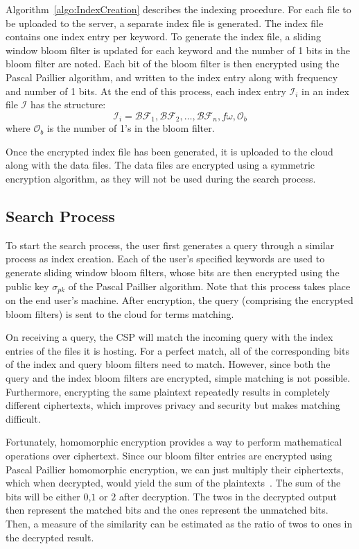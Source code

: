 Algorithm~\ref{algo:IndexCreation} describes the indexing procedure.
For each file to be uploaded to the server, a separate index file is generated. The index
file contains one index entry per keyword. To generate the index file, a sliding window bloom
filter is updated for each keyword and the number of 1 bits in the bloom filter are noted.
Each bit of the bloom filter is then encrypted using the Pascal Paillier algorithm, and written to 
the index entry along with frequency and number of 1 bits.
At the end of this process, each index entry $\mathcal{I}_i$ in an index file $\mathcal{I}$ has
the structure: 
\begin{equation}
\mathcal{I}_i = \mathcal{BF}_1,\mathcal{BF}_2, \ldots ,\mathcal{BF}_n, f\omega,
\mathcal{O}_b
  \label{eq: indexEntry}
\end{equation} 
where $\mathcal{O}_b$ is the number of 1's in the bloom filter.

Once the encrypted index file has been generated, it is uploaded to the cloud along with the data files.
The data files are encrypted using a symmetric encryption algorithm, as they will not be used during the
search process.

\subsection{Search Process}

To start the search process, the user first generates a query through a similar process as index creation. 
Each of the user's specified keywords are used to generate sliding window bloom filters, whose bits are then
encrypted using the public key $\sigma_{pk}$ of the Pascal Paillier algorithm. 
Note that this process takes place on the end user's machine. After encryption, 
the query (comprising the encrypted bloom filters) is sent to the cloud for terms matching.

On receiving a query, the CSP will match the incoming query with the index entries of 
the files it is hosting. For a perfect match, all of the corresponding bits of the index 
and query bloom filters need to match. However, since both the query and the index
bloom filters are encrypted, simple matching is not possible. Furthermore, encrypting the
same plaintext repeatedly results in completely different ciphertexts, which improves
privacy and security but makes matching difficult.

Fortunately, homomorphic encryption provides a way to perform mathematical operations 
over ciphertext. Since our bloom filter entries are encrypted using Pascal Paillier homomorphic
encryption, we can just multiply their ciphertexts, which when decrypted, would yield the sum of
the plaintexts~\cite{pascal}. The sum of the bits will be either $0$,$1$ or $2$ after decryption.
The twos in the decrypted output then represent the matched
bits and the ones represent the unmatched bits. Then, a measure of the similarity
can be estimated as the ratio of twos to ones in the decrypted result.

